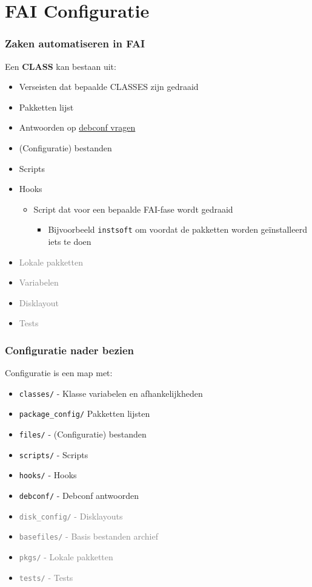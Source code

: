 \documentclass{beamer}
\newcommand{\light}[1]{\textcolor{gray}{#1}}
\begin{document}
\section{FAI Configuratie}


\begin{frame}
\frametitle{Zaken automatiseren in FAI}
Een \textbf{CLASS} kan bestaan uit:
\begin{itemize} 
  \item Verseisten dat bepaalde CLASSES zijn gedraaid
  \item Pakketten lijst
  \item Antwoorden op \href{https://wiki.debian.org/PackageManagement/Preseed}{debconf vragen}
  \item (Configuratie) bestanden
  \item Scripts
  \item<2-> Hooks
  \begin{itemize}
    \item Script dat voor een bepaalde FAI-fase wordt gedraaid
    \begin{itemize}
      \item Bijvoorbeeld \texttt{instsoft} om voordat de pakketten worden geïnstalleerd iets te doen
      \end{itemize}
  \end{itemize}
  \item<3-> \light{Lokale pakketten}
  \item<3-> \light{Variabelen}
  \item<3-> \light{Disklayout}
  \item<3-> \light{Tests}
\end{itemize}
\end{frame}

\begin{frame}
\frametitle{Configuratie nader bezien}
Configuratie is een map met:
\begin{itemize}
  \item \texttt{classes/} - Klasse variabelen en afhankelijkheden
  \item<2-> \texttt{package\_config/}  Pakketten lijsten
  \item<3-> \texttt{files/} - (Configuratie) bestanden
  \item<4-> \texttt{scripts/} - Scripts
  \item<5-> \texttt{hooks/} - Hooks
  \item<6-> \texttt{debconf/} - Debconf antwoorden
  \item<6-> \light{\texttt{disk\_config/} - Disklayouts}
  \item<6-> \light{\texttt{basefiles/} - Basis bestanden archief}
  \item<6-> \light{\texttt{pkgs/} - Lokale pakketten}
  \item<6-> \light{\texttt{tests/} - Tests}
\end{itemize}
\end{frame}
\end{document}
